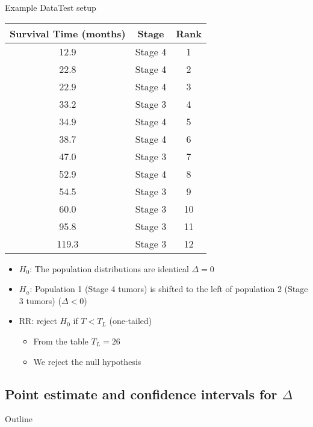 \documentclass[xcolor=dvipsnames]{beamer}
\begin{document}
\begin{frame}{Example Data}{Test setup}
\begin{center}{\tiny
		\begin{tabular}{|c|c|c|}
			\hline
			\textbf{Survival Time (months)} &  \textbf{Stage} & \textbf{Rank}\\ \hline \hline
			12.9 &Stage 4 & 1 \\ \hline
			22.8 &Stage 4 & 2\\ \hline
			22.9& Stage 4 & 3\\ \hline
			33.2 &Stage 3 & 4\\ \hline
			34.9& Stage 4 & 5\\ \hline
			38.7 &Stage 4 & 6\\ \hline
			47.0 &Stage 3 & 7\\ \hline		
			52.9  &Stage 4 & 8\\ \hline
			54.5 &Stage 3 & 9\\ \hline				
			60.0 &Stage 3 & 10\\ \hline
			95.8& Stage 3 & 11\\ \hline
			119.3 &Stage 3 & 12\\ \hline
	\end{tabular}}
\end{center}
\begin{itemize}
	\item $H_0$: The population distributions are identical $\Delta = 0$
	\item $H_a$: Population 1 (Stage 4 tumors) is shifted to the left of population 2 (Stage 3 tumors) ($\Delta < 0$)
	\item RR: reject $H_0$ if $T < T_L$ (one-tailed)
	\begin{itemize}
		\item From the table $T_L = 26$
		\item We reject the null hypothesis
	\end{itemize}
\end{itemize}
\end{frame}

\subsection{Point estimate and confidence intervals for $\Delta$}
\begin{frame}{Outline}
\tableofcontents[currentsection,subsectionstyle=show/shaded/hide]
\end{frame}
\end{document}
